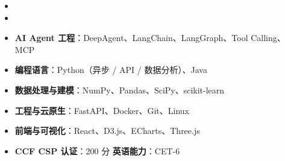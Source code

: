 \documentclass[UTF8,AutoFakeBold]{resume}
\begin{document}

\begin{itemize}
    \item {}
    \item {}
\end{itemize}

\begin{itemize}
    \item \kaishu\textbf{AI Agent 工程}：DeepAgent、LangChain、LangGraph、Tool Calling、MCP
    \item \kaishu\textbf{编程语言}：Python（异步 / API / 数据分析）、Java
    \item \kaishu\textbf{数据处理与建模}：NumPy、Pandas、SciPy、scikit-learn
    \item \kaishu\textbf{工程与云原生}：FastAPI、Docker、Git、Linux
    \item \kaishu\textbf{前端与可视化}：React、D3.js、ECharts、Three.js
    \item \kaishu\textbf{CCF CSP 认证}：200 分 \quad \textbf{英语能力}：CET-6
\end{itemize}
\end{document}
